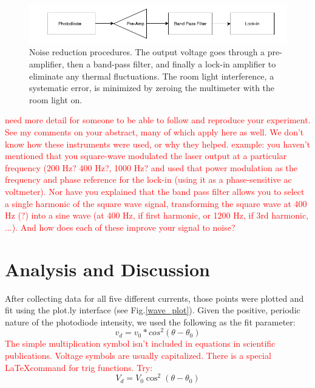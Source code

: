 \documentclass[prb,preprint]{revtex4-1}
\begin{document}
\begin{figure}[H]
    \centering
    \includegraphics[width=180mm]{Filter.pdf}
    \caption{Noise reduction procedures. The output voltage goes through a pre-amplifier, then a band-pass filter, and finally a lock-in amplifier to eliminate any thermal fluctuations. The room light interference, a systematic error, is minimized by zeroing the multimeter with the room light on.}
    \end{figure}
    
\textcolor{red}{need more detail for someone to be able to follow and reproduce your experiment. See my comments on your abstract, many of which apply here as well. We don't know how these instruments were used, or why they helped.  example: you haven't mentioned  that you square-wave modulated the laser output at a particular frequency (200 Hz? 400 Hz?, 1000 Hz?  and used that power modulation as the frequency and phase reference for the lock-in (using it as a phase-sensitive ac voltmeter). Nor have you explained that the band pass filter allows you to select a single harmonic of the square wave signal, transforming the square wave at 400 Hz (?) into a sine wave (at 400 Hz, if first harmonic, or 1200 Hz, if 3rd harmonic, ...). And how does each of these improve your signal to noise?}   

\section{Analysis and Discussion}
After collecting data for all five different currents, those points were plotted and fit using the plot.ly interface (see Fig.\ref{wave_plot}). Given the positive, periodic nature of the photodiode intensity, we used the following as the fit parameter:
\begin{equation}
\label{volt eqn}
v_d = v_0*cos^2(\theta -\theta _0)
\end{equation}
\textcolor{red}{The simple multiplication symbol isn't included in equations in scientific publications. Voltage symbols are usually capitalized. There is a special \LaTeX command for trig functions.  Try: }
\begin{equation}
\label{volt eqn}
V_d = V_0 \cos^2(\theta -\theta _0)
\end{equation}
\end{document}
